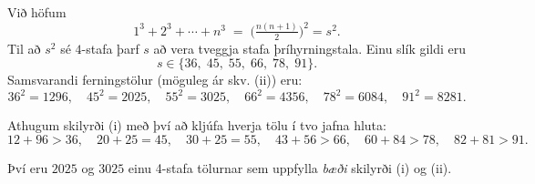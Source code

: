 Við höfum
\[
1^3 + 2^3 + \cdots + n^3 \;=\; \Big(\tfrac{n(n+1)}{2}\Big)^2 = s^2.
\]
Til að $s^2$ sé $4$-stafa þarf $s$ að vera tveggja stafa
þríhyrningstala. Einu slík gildi eru
\[
s \in \{36,\;45,\;55,\;66,\;78,\;91\}.
\]
Samsvarandi fernings­tölur (möguleg ár skv. (ii)) eru:
\[
36^2=1296,\quad 45^2=2025,\quad 55^2=3025,\quad 66^2=4356,\quad 78^2=6084,\quad 91^2=8281.
\]


Athugum skilyrði (i) með því að kljúfa hverja tölu í tvo jafna hluta:
\[
12 + 96 > 36, \quad
20 + 25 = 45, \quad
30 + 25 = 55, \quad
43 + 56 > 66, \quad
60 + 84 > 78, \quad
82 + 81 > 91.
\]

Því eru $2025$ og $3025$ einu 4-stafa tölurnar sem uppfylla \emph{bæði} skilyrði (i) og (ii).
